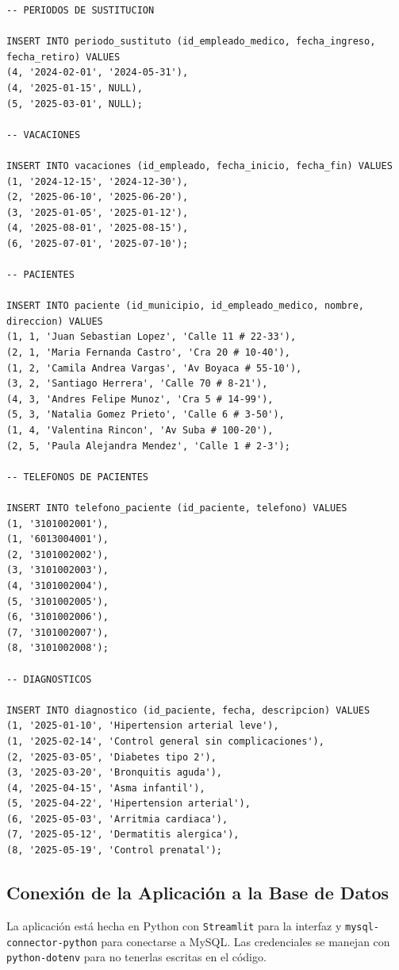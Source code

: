 \documentclass[12pt,a4paper]{article}
\begin{document}
{\begin{verbatim}
-- PERIODOS DE SUSTITUCION

INSERT INTO periodo_sustituto (id_empleado_medico, fecha_ingreso, fecha_retiro) VALUES
(4, '2024-02-01', '2024-05-31'),
(4, '2025-01-15', NULL),
(5, '2025-03-01', NULL);

-- VACACIONES

INSERT INTO vacaciones (id_empleado, fecha_inicio, fecha_fin) VALUES
(1, '2024-12-15', '2024-12-30'),
(2, '2025-06-10', '2025-06-20'),
(3, '2025-01-05', '2025-01-12'),
(4, '2025-08-01', '2025-08-15'),
(6, '2025-07-01', '2025-07-10');

-- PACIENTES

INSERT INTO paciente (id_municipio, id_empleado_medico, nombre, direccion) VALUES
(1, 1, 'Juan Sebastian Lopez', 'Calle 11 # 22-33'),
(2, 1, 'Maria Fernanda Castro', 'Cra 20 # 10-40'),
(1, 2, 'Camila Andrea Vargas', 'Av Boyaca # 55-10'),
(3, 2, 'Santiago Herrera', 'Calle 70 # 8-21'),
(4, 3, 'Andres Felipe Munoz', 'Cra 5 # 14-99'),
(5, 3, 'Natalia Gomez Prieto', 'Calle 6 # 3-50'),
(1, 4, 'Valentina Rincon', 'Av Suba # 100-20'),
(2, 5, 'Paula Alejandra Mendez', 'Calle 1 # 2-3');

-- TELEFONOS DE PACIENTES

INSERT INTO telefono_paciente (id_paciente, telefono) VALUES
(1, '3101002001'),
(1, '6013004001'),
(2, '3101002002'),
(3, '3101002003'),
(4, '3101002004'),
(5, '3101002005'),
(6, '3101002006'),
(7, '3101002007'),
(8, '3101002008');

-- DIAGNOSTICOS

INSERT INTO diagnostico (id_paciente, fecha, descripcion) VALUES
(1, '2025-01-10', 'Hipertension arterial leve'),
(1, '2025-02-14', 'Control general sin complicaciones'),
(2, '2025-03-05', 'Diabetes tipo 2'),
(3, '2025-03-20', 'Bronquitis aguda'),
(4, '2025-04-15', 'Asma infantil'),
(5, '2025-04-22', 'Hipertension arterial'),
(6, '2025-05-03', 'Arritmia cardiaca'),
(7, '2025-05-12', 'Dermatitis alergica'),
(8, '2025-05-19', 'Control prenatal');
\end{verbatim}}

\subsection{Conexi\'on de la Aplicaci\'on a la Base de Datos}

La aplicaci\'on est\'a hecha en Python con \texttt{Streamlit} para la interfaz y \texttt{mysql-connector-python} para conectarse a MySQL. Las credenciales se manejan con \texttt{python-dotenv} para no tenerlas escritas en el c\'odigo.
\end{document}
